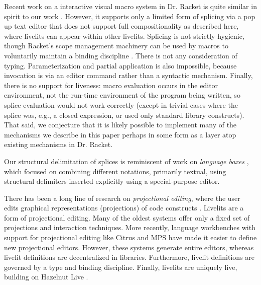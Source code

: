 Recent work on a interactive visual macro system in Dr. Racket 
is quite similar in spirit to our work \cite{interactive-visual-syntax}.
However, it supports only a limited form of splicing via a pop up text editor
that does not support full compositionality as described here, where livelits 
can appear within other livelits. Splicing is not strictly hygienic, though 
Racket's scope management machinery can be used by macros to voluntarily 
maintain a binding discipline \cite{DBLP:conf/popl/Flatt16}. There is not any 
consideration of typing. Parameterization and partial application is also impossible, because invocation 
is via an editor command rather than a syntactic mechanism. Finally,
there is no support for liveness: macro evaluation occurs in the editor 
environment, not the run-time environment of the program being written, 
so splice evaluation would not work correctly (except in trivial cases
where the splice was, e.g., a closed expression, or used only standard 
library constructs). That said, we conjecture that it is
likely possible to implement many of the mechanisms we describe in this paper 
perhaps in some form as a layer atop existing mechanisms in Dr. Racket.

Our structural delimitation of splices is reminiscent of work on 
\emph{language boxes} \cite{DBLP:conf/sle/RenggliDN09}, which focused on 
combining different notations, primarily textual, using structural delimiters inserted 
explicitly using a special-purpose editor. 

There has been a long line of research on \emph{projectional editing}, where
the user edits graphical representations (projections) of code constructs 
\cite{DBLP:journals/ile/MillerPMV94,read1996generating,DBLP:conf/sde/Reiss84,DBLP:conf/uist/KoM05}. Livelits are a form of projectional editing. 
Many of the oldest systems offer only a fixed set of projections and interaction techniques. 
More recently, language workbenches with support for projectional editing like Citrus \cite{DBLP:conf/uist/KoM05}
and MPS \cite{voelter2011language} have made it easier to define new projectional editors.
However, these systems generate entire editors, whereas livelit definitions 
are decentralized in libraries. 
Furthermore, livelit definitions are governed by a type and binding discipline.
Finally, livelits are uniquely live, building on Hazelnut Live \cite{HazelnutLive}.

